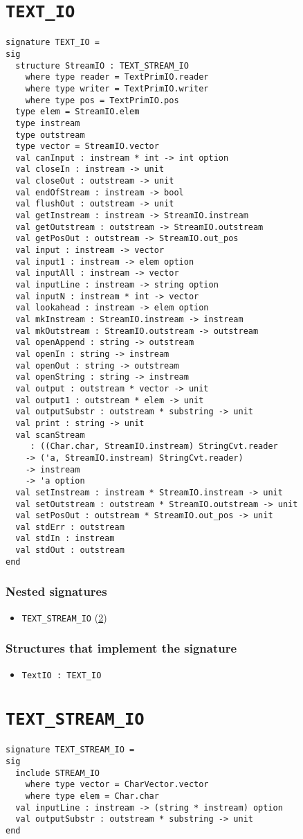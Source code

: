 \documentclass{jbook}
\newcommand{\txt}[2]{#2}
\newcommand{\code}[1]{\mbox{\large\tt #1}}
\newcommand{\signature}[2]{
\section{{\tt #1}}\label{section:reference:#2}
}
\newcommand{\sigref}[1]{\ref{section:reference:#1}}
\newcommand{\Structure}{\subsubsection*{\txt{シグネチャを実装するストラクチャ}{Structures that implement the signature}}}
\newcommand{\NestedSignature}{\subsubsection*{\txt{ネストしたシグネチャ}{Nested signatures}}}
\begin{document}
\signature{TEXT\_IO}{TEXTIO}
\begin{verbatim}
signature TEXT_IO =
sig
  structure StreamIO : TEXT_STREAM_IO
    where type reader = TextPrimIO.reader
    where type writer = TextPrimIO.writer
    where type pos = TextPrimIO.pos
  type elem = StreamIO.elem
  type instream
  type outstream
  type vector = StreamIO.vector
  val canInput : instream * int -> int option
  val closeIn : instream -> unit
  val closeOut : outstream -> unit
  val endOfStream : instream -> bool
  val flushOut : outstream -> unit
  val getInstream : instream -> StreamIO.instream
  val getOutstream : outstream -> StreamIO.outstream
  val getPosOut : outstream -> StreamIO.out_pos
  val input : instream -> vector
  val input1 : instream -> elem option
  val inputAll : instream -> vector
  val inputLine : instream -> string option
  val inputN : instream * int -> vector
  val lookahead : instream -> elem option
  val mkInstream : StreamIO.instream -> instream
  val mkOutstream : StreamIO.outstream -> outstream
  val openAppend : string -> outstream
  val openIn : string -> instream
  val openOut : string -> outstream
  val openString : string -> instream
  val output : outstream * vector -> unit
  val output1 : outstream * elem -> unit
  val outputSubstr : outstream * substring -> unit
  val print : string -> unit
  val scanStream 
     : ((Char.char, StreamIO.instream) StringCvt.reader
	-> ('a, StreamIO.instream) StringCvt.reader) 
	-> instream 
	-> 'a option
  val setInstream : instream * StreamIO.instream -> unit
  val setOutstream : outstream * StreamIO.outstream -> unit
  val setPosOut : outstream * StreamIO.out_pos -> unit
  val stdErr : outstream
  val stdIn : instream
  val stdOut : outstream
end
\end{verbatim}
\NestedSignature
\begin{itemize}
\item \code{TEXT\_STREAM\_IO} (\sigref{TEXTSTREAMIO})
\end{itemize}

\Structure
\begin{itemize}
\item \code{TextIO : TEXT\_IO}
\end{itemize}

\signature{TEXT\_STREAM\_IO}{TEXTSTREAMIO}
\begin{verbatim}
signature TEXT_STREAM_IO =
sig
  include STREAM_IO
    where type vector = CharVector.vector
    where type elem = Char.char
  val inputLine : instream -> (string * instream) option
  val outputSubstr : outstream * substring -> unit
end
\end{verbatim}
\end{document}
